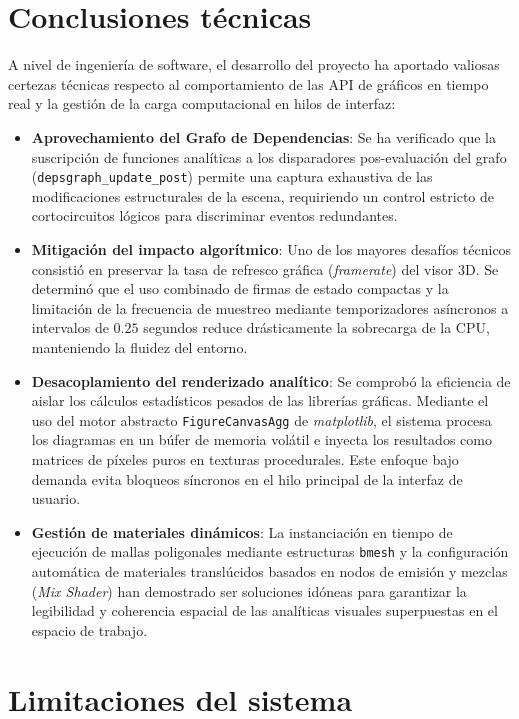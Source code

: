 \section{Conclusiones técnicas}

A nivel de ingeniería de software, el desarrollo del proyecto ha aportado valiosas certezas técnicas respecto al comportamiento de las API de gráficos en tiempo real y la gestión de la carga computacional en hilos de interfaz:

\begin{itemize}
    \item \textbf{Aprovechamiento del Grafo de Dependencias}: Se ha verificado que la suscripción de funciones analíticas a los disparadores pos-evaluación del grafo (\texttt{depsgraph\_update\_post}) permite una captura exhaustiva de las modificaciones estructurales de la escena, requiriendo un control estricto de cortocircuitos lógicos para discriminar eventos redundantes.
    \item \textbf{Mitigación del impacto algorítmico}: Uno de los mayores desafíos técnicos consistió en preservar la tasa de refresco gráfica (\textit{framerate}) del visor 3D. Se determinó que el uso combinado de firmas de estado compactas y la limitación de la frecuencia de muestreo mediante temporizadores asíncronos a intervalos de $0.25$ segundos reduce drásticamente la sobrecarga de la CPU, manteniendo la fluidez del entorno.
    \item \textbf{Desacoplamiento del renderizado analítico}: Se comprobó la eficiencia de aislar los cálculos estadísticos pesados de las librerías gráficas. Mediante el uso del motor abstracto \texttt{FigureCanvasAgg} de \textit{matplotlib}, el sistema procesa los diagramas en un búfer de memoria volátil e inyecta los resultados como matrices de píxeles puros en texturas procedurales. Este enfoque bajo demanda evita bloqueos síncronos en el hilo principal de la interfaz de usuario.
    \item \textbf{Gestión de materiales dinámicos}: La instanciación en tiempo de ejecución de mallas poligonales mediante estructuras \texttt{bmesh} y la configuración automática de materiales translúcidos basados en nodos de emisión y mezclas (\textit{Mix Shader}) han demostrado ser soluciones idóneas para garantizar la legibilidad y coherencia espacial de las analíticas visuales superpuestas en el espacio de trabajo.
\end{itemize}

\section{Limitaciones del sistema}

